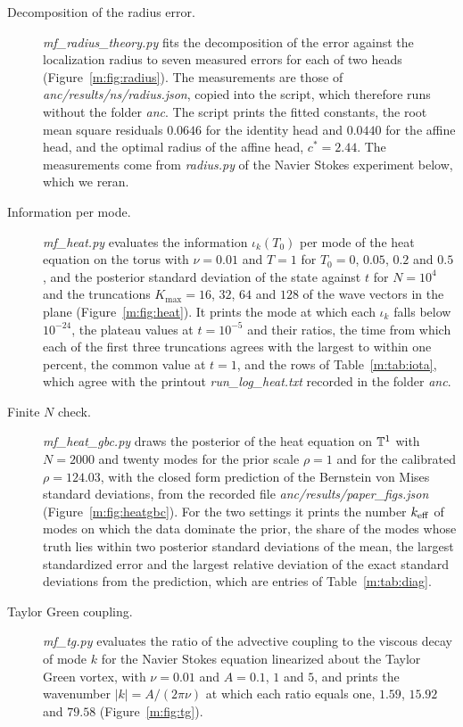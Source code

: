 \begin{description}
\item[Decomposition of the radius error.] \textit{mf\_radius\_theory.py} fits the decomposition of the error against the localization radius to seven measured errors for each of two heads (Figure~\ref{m:fig:radius}). The measurements are those of \textit{anc/results/ns/radius.json}, copied into the script, which therefore runs without the folder \textit{anc}. The script prints the fitted constants, the root mean square residuals $0.0646$ for the identity head and $0.0440$ for the affine head, and the optimal radius of the affine head, $c^*=2.44$. The measurements come from \textit{radius.py} of the Navier Stokes experiment below, which we reran.
\item[Information per mode.] \textit{mf\_heat.py} evaluates the information $\iota_k(T_0)$ per mode of the heat equation on the torus with $\nu=0.01$ and $T=1$ for $T_0=0$, $0.05$, $0.2$ and $0.5$, and the posterior standard deviation of the state against $t$ for $N=10^4$ and the truncations $K_{\max}=16$, $32$, $64$ and $128$ of the wave vectors in the plane (Figure~\ref{m:fig:heat}). It prints the mode at which each $\iota_k$ falls below $10^{-24}$, the plateau values at $t=10^{-5}$ and their ratios, the time from which each of the first three truncations agrees with the largest to within one percent, the common value at $t=1$, and the rows of Table~\ref{m:tab:iota}, which agree with the printout \textit{run\_log\_heat.txt} recorded in the folder \textit{anc}.
\item[Finite $N$ check.] \textit{mf\_heat\_gbc.py} draws the posterior of the heat equation on $\mathbb{T}^1$ with $N=2000$ and twenty modes for the prior scale $\rho=1$ and for the calibrated $\rho=124.03$, with the closed form prediction of the Bernstein von Mises standard deviations, from the recorded file \textit{anc/results/paper\_figs.json} (Figure~\ref{m:fig:heatgbc}). For the two settings it prints the number $k_{\rm eff}$ of modes on which the data dominate the prior, the share of the modes whose truth lies within two posterior standard deviations of the mean, the largest standardized error and the largest relative deviation of the exact standard deviations from the prediction, which are entries of Table~\ref{m:tab:diag}.
\item[Taylor Green coupling.] \textit{mf\_tg.py} evaluates the ratio of the advective coupling to the viscous decay of mode $k$ for the Navier Stokes equation linearized about the Taylor Green vortex, with $\nu=0.01$ and $A=0.1$, $1$ and $5$, and prints the wavenumber $|k|=A/(2\pi\nu)$ at which each ratio equals one, $1.59$, $15.92$ and $79.58$ (Figure~\ref{m:fig:tg}).

\end{description}
